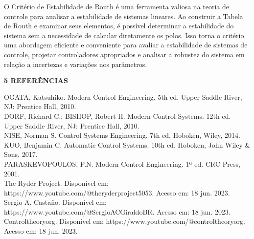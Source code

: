 O Critério de Estabilidade de Routh é uma ferramenta valiosa na teoria de controle para analisar a estabilidade de sistemas lineares. Ao construir a Tabela de Routh e examinar seus elementos, é possível determinar a estabilidade do sistema sem a necessidade de calcular diretamente os polos. Isso torna o critério uma abordagem eficiente e conveniente para avaliar a estabilidade de sistemas de controle, projetar controladores apropriados e analisar a robustez do sistema em relação a incertezas e variações nos parâmetros.



\newpage

\begin{flushleft}
	 \textcolor{myBlue}{\textbf{\Large{5 REFERÊNCIAS }}}
\end{flushleft}

\noindent OGATA, Katsuhiko. Modern Control Engineering. 5th ed. Upper Saddle River, NJ: Prentice Hall, 2010.\\

\noindent DORF, Richard C.; BISHOP, Robert H. Modern Control Systems. 12th ed. Upper Saddle River, NJ: Prentice Hall, 2010. \\

\noindent NISE, Norman S. Control Systems Engineering. 7th ed. Hoboken, Wiley, 2014.\\

\noindent KUO, Benjamin C. Automatic Control Systems. 10th ed. Hoboken, John Wiley \& Sons, 2017.\\

\noindent PARASKEVOPOULOS, P.N. Modern Control Engineering. 1ª ed. CRC Press, 2001.\\

\noindent The Ryder Project. Disponível em: https://www.youtube.com/@theryderproject5053. Acesso em: 18 jun. 2023.\\

\noindent Sergio A. Castaño. Disponível em: https://www.youtube.com/@SergioACGiraldoBR. Acesso em: 18 jun. 2023.\\

\noindent Controltheoryorg. Disponível em: https://www.youtube.com/@controltheoryorg. Acesso em: 18 jun. 2023.
